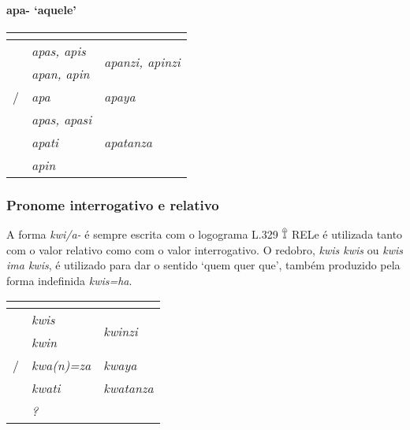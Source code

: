 \paragraph{apa- `aquele'}

\begin{center}
	\begin{tabular}[c]{lll}
		\toprule
		                 & \Sg{}\emph{}       & \Pl{}\emph{}                             \\
		\midrule
		\Nom{} \Com{}    & \emph{apas, apis}  & \multirow{2}{4em}{\emph{apanzi, apinzi}} \\
		\Acu{} \Com{}    & \emph{apan, apin}  &                                          \\
		\Nom/\Acu\Neut{} & \emph{apa}         & \emph{apaya}                             \\
		\Gen{}           & \emph{apas, apasi} &                                          \\
		\Dat{}           & \emph{apati}       & \emph{apatanza}                          \\
		\Abl{}           & \emph{apin}        & \emph{}                                  \\
		\bottomrule
	\end{tabular}
\end{center}

\subsubsection{Pronome interrogativo e relativo}

A forma \emph{kwi\slash{}a-} é sempre escrita com o logograma L.329 𔕰 REL\@ e
é utilizada tanto com o valor relativo como com o valor interrogativo.
O redobro, \emph{kwis kwis} ou \emph{kwis ima kwis}, é utilizado para dar o
sentido `quem quer que', também produzido pela forma indefinida \emph{kwis=ha}.

\begin{center}
	\begin{tabular}[c]{lll}
		\toprule
		                 & \Sg{}\emph{}       & \Pl{}\emph{}                     \\
		\midrule
		\Nom{} \Com{}    & \emph{kwis}        & \multirow{2}{4em}{\emph{kwinzi}} \\
		\Acu{} \Com{}    & \emph{kwin}        &                                  \\
		\Nom/\Acu\Neut{} & \emph{kwa{(n)}=za} & \emph{kwaya}                     \\
		\Dat{}           & \emph{kwati}       & \emph{kwatanza}                  \\
		\Abl{}           & \emph{?}           & \emph{}                          \\
		\bottomrule
	\end{tabular}
\end{center}


